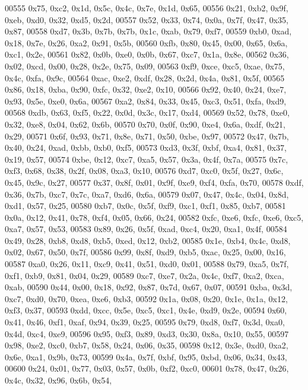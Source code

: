 \begin{DoxyCode}
00555   0x75, 0xc2, 0x1d, 0x5c, 0x4c, 0x7e, 0x1d, 0x65,
00556   0x21, 0xb2, 0x9f, 0xeb, 0xd0, 0x32, 0xd5, 0x2d,
00557   0x52, 0x33, 0x74, 0x0a, 0x7f, 0x47, 0x35, 0x87,
00558   0xd7, 0x3b, 0x7b, 0x7b, 0x1c, 0xab, 0x79, 0xf7,
00559   0xb0, 0xad, 0x18, 0x7e, 0x26, 0xa2, 0x91, 0x5b,
00560   0xfb, 0x80, 0x45, 0x00, 0x65, 0x6a, 0xc1, 0x2e,
00561   0x82, 0x0b, 0xe0, 0x0b, 0x67, 0xc7, 0x1a, 0x8e,
00562   0x36, 0x02, 0xcd, 0x00, 0x28, 0x2e, 0x75, 0x09,
00563   0xf9, 0xce, 0xc5, 0xae, 0x75, 0x4c, 0xfa, 0x9c,
00564   0xac, 0xe2, 0xdf, 0x28, 0x2d, 0x4a, 0x81, 0x5f,
00565   0x86, 0x18, 0xba, 0x90, 0xfc, 0x32, 0xe2, 0x10,
00566   0x92, 0x40, 0x24, 0xe7, 0x93, 0x5e, 0xe0, 0x6a,
00567   0xa2, 0x84, 0x33, 0x45, 0xc3, 0x51, 0xfa, 0xd9,
00568   0xdb, 0x63, 0xf5, 0x22, 0x0d, 0x3c, 0x17, 0xd4,
00569   0x52, 0x78, 0xe0, 0x32, 0xe8, 0x04, 0x62, 0x6b,
00570   0x70, 0x0f, 0x90, 0xe4, 0x6a, 0xdf, 0x21, 0x29,
00571   0x6f, 0x93, 0x71, 0x8e, 0x71, 0x50, 0xbe, 0x97,
00572   0x47, 0x7b, 0x40, 0x24, 0xad, 0xbb, 0xb0, 0xf5,
00573   0xd3, 0x3f, 0xbf, 0xa4, 0x81, 0x37, 0x19, 0x57,
00574   0xbe, 0x12, 0xc7, 0xa5, 0x57, 0x3a, 0x4f, 0x7a,
00575   0x7c, 0xf3, 0x68, 0x38, 0x2f, 0x08, 0xa3, 0x10,
00576   0xd7, 0xc0, 0x5f, 0x27, 0x6c, 0x45, 0x9c, 0x27,
00577   0x37, 0x8f, 0x01, 0x9f, 0xe9, 0xf4, 0xfa, 0x70,
00578   0xdf, 0x36, 0x7b, 0xc7, 0x7c, 0xa7, 0xd6, 0x6a,
00579   0x07, 0x47, 0x4c, 0x04, 0x8d, 0xd1, 0x57, 0x25,
00580   0xb7, 0x0c, 0x5f, 0xf9, 0xc1, 0xf1, 0x85, 0xb7,
00581   0x0a, 0x12, 0x41, 0x78, 0xf4, 0x05, 0x66, 0x24,
00582   0xfc, 0xe6, 0xfc, 0xe6, 0xc5, 0xa7, 0x57, 0x53,
00583   0x89, 0x26, 0x5f, 0xad, 0xc4, 0x20, 0xa1, 0x4f,
00584   0x49, 0x28, 0xb8, 0xd8, 0xb5, 0xed, 0x12, 0xb2,
00585   0x1e, 0xb4, 0x4c, 0xd8, 0x02, 0x67, 0x50, 0x7f,
00586   0x99, 0x8f, 0xd9, 0xb5, 0xac, 0x25, 0x00, 0x16,
00587   0xa0, 0x26, 0x11, 0xc9, 0x41, 0x51, 0xd0, 0x01,
00588   0x79, 0xa5, 0x7f, 0xf1, 0xb9, 0x81, 0x04, 0x29,
00589   0xc7, 0xe7, 0x2a, 0x4c, 0xf7, 0xa2, 0xca, 0xab,
00590   0x44, 0x00, 0x18, 0x92, 0x87, 0x7d, 0x67, 0x07,
00591   0xba, 0x3d, 0xc7, 0xd0, 0x70, 0xea, 0xe6, 0xb3,
00592   0x1a, 0x08, 0x20, 0x1e, 0x1a, 0x12, 0xf3, 0x37,
00593   0xdd, 0xcc, 0x5e, 0xc5, 0xc1, 0x4e, 0xd9, 0x2e,
00594   0x60, 0x41, 0x46, 0xf1, 0xaf, 0x94, 0x39, 0x25,
00595   0x79, 0xd8, 0xf7, 0x3d, 0xa0, 0x4d, 0xc4, 0xe9,
00596   0x95, 0xf3, 0x89, 0xd3, 0x30, 0x8a, 0x10, 0x55,
00597   0x98, 0xe2, 0xc0, 0xb7, 0x58, 0x24, 0x06, 0x35,
00598   0x12, 0x3e, 0xd0, 0xa2, 0x6e, 0xa1, 0x9b, 0x73,
00599   0x4a, 0x7f, 0xbf, 0x95, 0xbd, 0x06, 0x34, 0x43,
00600   0x24, 0x01, 0x77, 0x03, 0x57, 0x0b, 0xf2, 0xc0,
00601   0x78, 0x47, 0x26, 0x4c, 0x32, 0x96, 0x6b, 0x54,

\end{DoxyCode}
